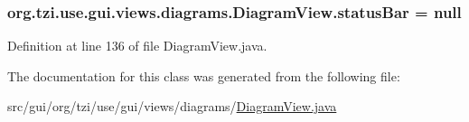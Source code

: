 \hypertarget{classorg_1_1tzi_1_1use_1_1gui_1_1views_1_1diagrams_1_1_diagram_view_a8889eaf20740f2bbb309905949a82dc3}{
\subsubsection[{status\-Bar}]{ org.\-tzi.\-use.\-gui.\-views.\-diagrams.\-Diagram\-View.\-status\-Bar = null\hspace{0.3cm}{\ttfamily [protected]}}}\label{classorg_1_1tzi_1_1use_1_1gui_1_1views_1_1diagrams_1_1_diagram_view_a8889eaf20740f2bbb309905949a82dc3}


Definition at line 136 of file Diagram\-View.\-java.



The documentation for this class was generated from the following file\-:\begin{DoxyCompactItemize}
\item 
src/gui/org/tzi/use/gui/views/diagrams/\hyperlink{_diagram_view_8java}{Diagram\-View.\-java}\end{DoxyCompactItemize}
